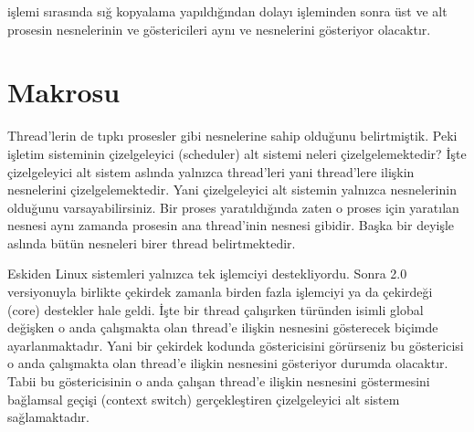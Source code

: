 \documentclass[a4paper,10pt,turkish]{sphinxmanual}
\begin{document}
\sphinxAtStartPar
{} işlemi sırasında sığ kopyalama yapıldığından dolayı  işleminden sonra üst ve alt prosesin
 nesnelerinin  ve  göstericileri aynı  ve 
nesnelerini gösteriyor olacaktır.


\section{ Makrosu}
\label{\detokenize{processcontrolblock:current-makrosu}}
\sphinxAtStartPar
Thread’lerin de tıpkı prosesler gibi  nesnelerine sahip olduğunu belirtmiştik. Peki
işletim sisteminin çizelgeleyici (scheduler) alt sistemi neleri çizelgelemektedir? İşte çizelgeleyici
alt sistem aslında yalnızca thread’leri yani thread’lere ilişkin  nesnelerini
çizelgelemektedir. Yani çizelgeleyici alt sistemin  yalnızca
 nesnelerinin olduğunu varsayabilirsiniz. Bir proses yaratıldığında zaten o proses için
yaratılan  nesnesi aynı zamanda prosesin ana thread’inin  nesnesi gibidir.
Başka bir deyişle aslında bütün  nesneleri birer thread belirtmektedir.

\sphinxAtStartPar
Eskiden Linux sistemleri yalnızca tek işlemciyi destekliyordu. Sonra 2.0 versiyonuyla birlikte çekirdek
zamanla birden fazla işlemciyi ya da çekirdeği (core) destekler hale geldi. İşte bir thread çalışırken
 türünden  isimli global değişken o anda çalışmakta olan thread’e ilişkin
 nesnesini gösterecek biçimde ayarlanmaktadır. Yani bir çekirdek kodunda 
göstericisini görürseniz bu  göstericisi o anda çalışmakta olan thread’e ilişkin 
nesnesini gösteriyor durumda olacaktır. Tabii bu  göstericisinin o anda çalışan thread’e ilişkin
 nesnesini göstermesini bağlamsal geçişi (context switch) gerçekleştiren çizelgeleyici alt
sistem sağlamaktadır.
\end{document}
